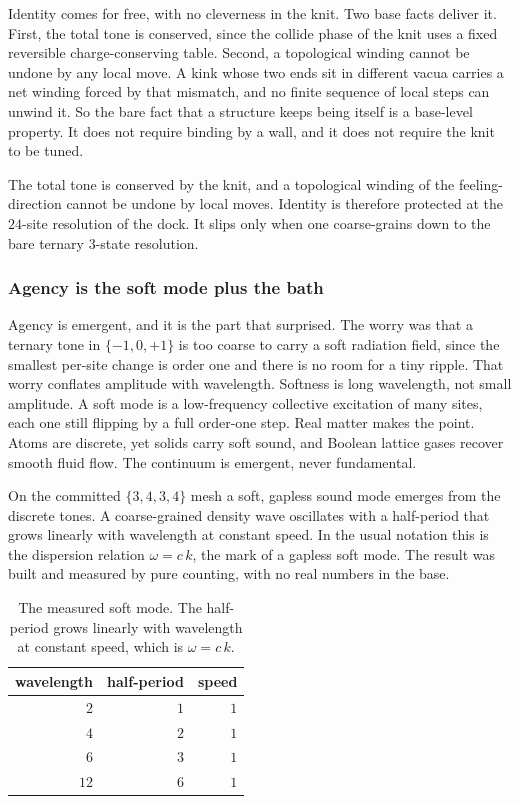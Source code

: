 Identity comes for free, with no cleverness in the knit. Two base facts deliver it. First, the total tone is conserved, since the collide phase of the knit uses a fixed reversible charge-conserving table. Second, a topological winding cannot be undone by any local move. A kink whose two ends sit in different vacua carries a net winding forced by that mismatch, and no finite sequence of local steps can unwind it. So the bare fact that a structure keeps being itself is a base-level property. It does not require binding by a wall, and it does not require the knit to be tuned.

\begin{proposition}
The total tone is conserved by the knit, and a topological winding of the feeling-direction cannot be undone by local moves. Identity is therefore protected at the $24$-site resolution of the dock. It slips only when one coarse-grains down to the bare ternary $3$-state resolution.
\end{proposition}

\subsubsection{Agency is the soft mode plus the bath}

Agency is emergent, and it is the part that surprised. The worry was that a ternary tone in $\{-1, 0, +1\}$ is too coarse to carry a soft radiation field, since the smallest per-site change is order one and there is no room for a tiny ripple. That worry conflates amplitude with wavelength. Softness is long wavelength, not small amplitude. A soft mode is a low-frequency collective excitation of many sites, each one still flipping by a full order-one step. Real matter makes the point. Atoms are discrete, yet solids carry soft sound, and Boolean lattice gases recover smooth fluid flow. The continuum is emergent, never fundamental.

On the committed $\{3,4,3,4\}$ mesh a soft, gapless sound mode emerges from the discrete tones. A coarse-grained density wave oscillates with a half-period that grows linearly with wavelength at constant speed. In the usual notation this is the dispersion relation $\omega = c\, k$, the mark of a gapless soft mode. The result was built and measured by pure counting, with no real numbers in the base.

\begin{table}[ht]
\centering
\begin{tabular}{@{}rrr@{}}
\toprule
wavelength & half-period & speed \\
\midrule
$2$ & $1$ & $1$ \\
$4$ & $2$ & $1$ \\
$6$ & $3$ & $1$ \\
$12$ & $6$ & $1$ \\
\bottomrule
\end{tabular}
\caption{The measured soft mode. The half-period grows linearly with wavelength at constant speed, which is $\omega = c\, k$.}
\label{tab:soft-mode}
\end{table}

